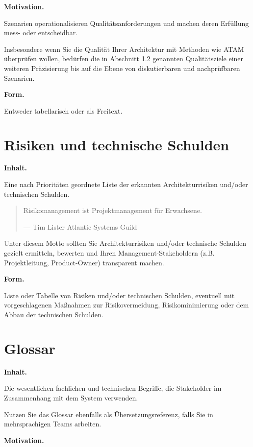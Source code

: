 \documentclass[]{article}
\begin{document}
\textbf{Motivation.}

Szenarien operationalisieren Qualitätsanforderungen und machen deren
Erfüllung mess- oder entscheidbar.

Insbesondere wenn Sie die Qualität Ihrer Architektur mit Methoden wie
ATAM überprüfen wollen, bedürfen die in Abschnitt 1.2 genannten
Qualitätsziele einer weiteren Präzisierung bis auf die Ebene von
diskutierbaren und nachprüfbaren Szenarien.

\textbf{Form.}

Entweder tabellarisch oder als Freitext.

\hypertarget{section-technical-risks}{%
\section{Risiken und technische
Schulden}\label{section-technical-risks}}

\textbf{Inhalt.}

Eine nach Prioritäten geordnete Liste der erkannten Architekturrisiken
und/oder technischen Schulden.

\begin{quote}
Risikomanagement ist Projektmanagement für Erwachsene.

---  Tim Lister Atlantic Systems Guild
\end{quote}

Unter diesem Motto sollten Sie Architekturrisiken und/oder technische
Schulden gezielt ermitteln, bewerten und Ihren Management-Stakeholdern
(z.B. Projektleitung, Product-Owner) transparent machen.

\textbf{Form.}

Liste oder Tabelle von Risiken und/oder technischen Schulden, eventuell
mit vorgeschlagenen Maßnahmen zur Risikovermeidung, Risikominimierung
oder dem Abbau der technischen Schulden.

\hypertarget{section-glossary}{%
\section{Glossar}\label{section-glossary}}

\textbf{Inhalt.}

Die wesentlichen fachlichen und technischen Begriffe, die Stakeholder im
Zusammenhang mit dem System verwenden.

Nutzen Sie das Glossar ebenfalls als Übersetzungsreferenz, falls Sie in
mehrsprachigen Teams arbeiten.

\textbf{Motivation.}
\end{document}
